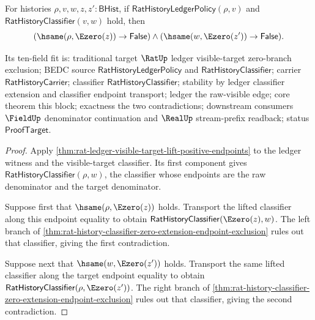 \begin{theorem}
\label{thm:rat-ledger-visible-target-zero-extension-exclusion}
For histories $\rho,v,w,z,z':\mathsf{BHist}$, if
$\mathsf{RatHistoryLedgerPolicy}(\rho,v)$ and
$\mathsf{RatHistoryClassifier}(v,w)$ hold, then
$$
(\hsame(\rho,\Ezero(z))\to\mathsf{False})\land
(\hsame(w,\Ezero(z'))\to\mathsf{False}).
$$

Its ten-field fit is: traditional target $\RatUp$ ledger visible-target
zero-branch exclusion; BEDC source $\mathsf{RatHistoryLedgerPolicy}$ and
$\mathsf{RatHistoryClassifier}$; carrier $\mathsf{RatHistoryCarrier}$;
classifier $\mathsf{RatHistoryClassifier}$; stability by ledger classifier
extension and classifier endpoint transport; ledger the raw-visible edge; core
theorem this block; exactness the two contradictions; downstream consumers
$\FieldUp$ denominator continuation and $\RealUp$ stream-prefix readback;
status $\mathsf{ProofTarget}$.
\end{theorem}
\begin{proof}
Apply
\autoref{thm:rat-ledger-visible-target-lift-positive-endpoints} to the ledger
witness and the visible-target classifier. Its first component gives
$\mathsf{RatHistoryClassifier}(\rho,w)$, the classifier whose endpoints are the
raw denominator and the target denominator.

Suppose first that $\hsame(\rho,\Ezero(z))$ holds. Transport the lifted
classifier along this endpoint equality to obtain
$\mathsf{RatHistoryClassifier}(\Ezero(z),w)$. The left branch of
\autoref{thm:rat-history-classifier-zero-extension-endpoint-exclusion} rules
out that classifier, giving the first contradiction.

Suppose next that $\hsame(w,\Ezero(z'))$ holds. Transport the same lifted
classifier along the target endpoint equality to obtain
$\mathsf{RatHistoryClassifier}(\rho,\Ezero(z'))$. The right branch of
\autoref{thm:rat-history-classifier-zero-extension-endpoint-exclusion} rules
out that classifier, giving the second contradiction.
\end{proof}

